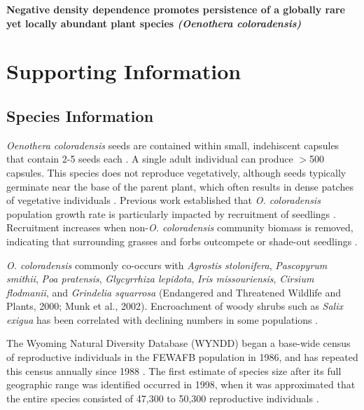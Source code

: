 \documentclass[12pt, letterpaper]{article}
\begin{document}
\begin{flushleft}
\large\textbf{Negative density dependence promotes persistence of a globally rare yet locally abundant plant species \textit{(Oenothera coloradensis)}}

\end{flushleft}

\section*{Supporting Information}
\normalfont
\subsection{Species Information}
\textit{Oenothera coloradensis} seeds are contained within small, indehiscent capsules that contain 2-5 seeds each \cite{Burgess2005CapsuleColoradensis}. A single adult individual can produce $>$500 capsules. This species does not reproduce vegetatively, although seeds typically germinate near the base of the parent plant, which often results in dense patches of vegetative individuals \cite{Heidel202133-YearWyoming}. Previous work established that \textit{O. coloradensis} population growth rate is particularly impacted by recruitment of seedlings \cite{Floyd1998}. Recruitment increases when non-\textit{O. coloradensis} community biomass is removed, indicating that surrounding grasses and forbs outcompete or shade-out seedlings \cite{Munk2002RosetteSpecies}.
\nocite{krakosPersonalComm}

\textit{O. coloradensis} commonly co-occurs with \textit{Agrostis stolonifera}, \textit{Pascopyrum smithii}, \textit{Poa pratensis}, \textit{Glycyrrhiza lepidota}, \textit{Iris missouriensis}, \textit{Cirsium flodmanii}, and \textit{Grindelia squarrosa} (Endangered and Threatened Wildlife and Plants, 2000; Munk et al., 2002). Encroachment of woody shrubs such as \textit{Salix exigua} has been correlated with declining numbers in some populations \cite{Heidel202133-YearWyoming}.
\nocite{USFWS2019}

The Wyoming Natural Diversity Database (WYNDD) began a base-wide census of reproductive individuals in the FEWAFB population in 1986, and has repeated this census annually since 1988 \cite{Heidel202133-YearWyoming}. The first estimate of species size after its full geographic range was identified occurred in 1998, when it was approximated that the entire species consisted of 47,300 to 50,300 reproductive individuals \cite{Fertig2000-ow}.
\end{document}
